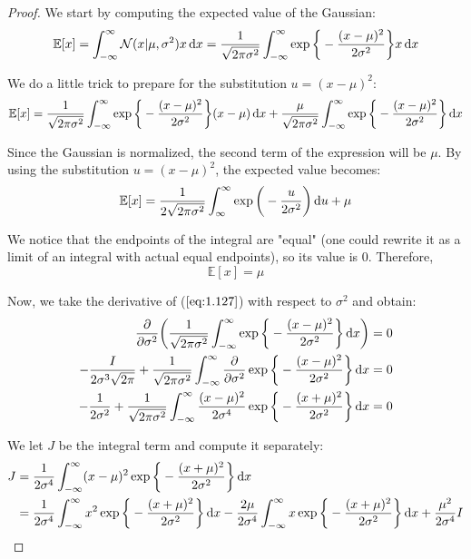 \vspace{1em}
\begin{proof}
    We start by computing the expected value of the Gaussian:
    \[
        \mathbb{E}[x] = \int_{-\infty}^{\infty} \mathcal{N}(x | \mu, \sigma^2) x \mathop{}\!\mathrm{d} x
        = \frac{1}{\sqrt{2\pi\sigma^2}} \int_{-\infty}^{\infty} 
            \exp \bigg\{-\frac{(x - \mu)^2}{2\sigma^2}\bigg\} x \mathop{}\!\mathrm{d} x
    \] 

    We do a little trick to prepare for the substitution $u = (x - \mu)^2$:
    \[
        \mathbb{E}[x] = \frac{1}{\sqrt{2\pi\sigma^2}} \int_{-\infty}^{\infty} 
        \exp\bigg\{-\frac{(x - \mu)^2}{2\sigma^2}\bigg\} (x - \mu) \mathop{}\!\mathrm{d} x 
        + \frac{\mu}{\sqrt{2\pi\sigma^2}} \int_{-\infty}^{\infty} \exp\bigg\{-\frac{(x - \mu)^2}{2\sigma^2}\bigg\} \mathop{}\!\mathrm{d} x
    \] 

    Since the Gaussian is normalized, the second term of the expression will be $\mu$.
    By using the substitution $u = (x - \mu)^2$, the expected value becomes:
    \[
        \mathbb{E}[x] 
        = \frac{1}{2\sqrt{2\pi\sigma^2}} \int_{\infty}^{\infty} \exp\bigg(-\frac{u}{2\sigma^2}\bigg) \mathop{}\!\mathrm{d} u + \mu
    \] 

    We notice that the endpoints of the integral are "equal" (one could rewrite it as a
    limit of an integral with actual equal endpoints), so its value is 0. Therefore,
    \begin{equation}\label{eq:1.49}\tag{1.49}
        \mathbb{E}[x] = \mu
    \end{equation}

    Now, we take the derivative of ($\ref{eq:1.127}$) with respect to $\sigma^2$ and obtain:
    \begin{align*}
        \pdv{\sigma^2} \bigg(\frac{1}{\sqrt{2\pi \sigma^2}} 
        \int_{-\infty}^{\infty} \exp \bigg\{-\frac{(x - \mu)^2}{2\sigma^2}\bigg\} \mathop{}\!\mathrm{d} x\bigg) &= 0 \\
        -\frac{I}{2\sigma^3\sqrt{2\pi}} + 
        \frac{1}{\sqrt{2\pi\sigma^2}} \int_{-\infty}^{\infty} \pdv{\sigma^2} 
        \exp \bigg\{-\frac{(x - \mu)^2}{2\sigma^2}\bigg\} \mathop{}\!\mathrm{d} x &= 0 \\
        -\frac{1}{2\sigma^2} + 
        \frac{1}{\sqrt{2\pi\sigma^2}} \int_{-\infty}^{\infty}
        \frac{(x - \mu)^2}{2\sigma^4} \exp\bigg\{-\frac{(x + \mu)^2}{2\sigma^2}\bigg\} \mathop{}\!\mathrm{d} x &= 0
    \end{align*}

    We let $J$ be the integral term and compute it separately:
    \begin{align*}
        J &= \frac{1}{2\sigma^4} \int_{-\infty}^{\infty} (x - \mu)^2 \exp \bigg\{-\frac{(x + \mu)^2}{2\sigma^2}\bigg\} \mathop{}\!\mathrm{d} x \\
          &= \frac{1}{2\sigma^4} \int_{-\infty}^{\infty} x^2 
            \exp \bigg\{-\frac{(x+\mu)^2}{2\sigma^2}\bigg\} \mathop{}\!\mathrm{d} x
        - \frac{2\mu}{2\sigma^4} \int_{-\infty}^{\infty} x 
            \exp \bigg\{-\frac{(x+\mu)^2}{2\sigma^2}\bigg\} \mathop{}\!\mathrm{d} x
        + \frac{\mu^2}{2\sigma^4} I
    \end{align*}


\end{proof}
